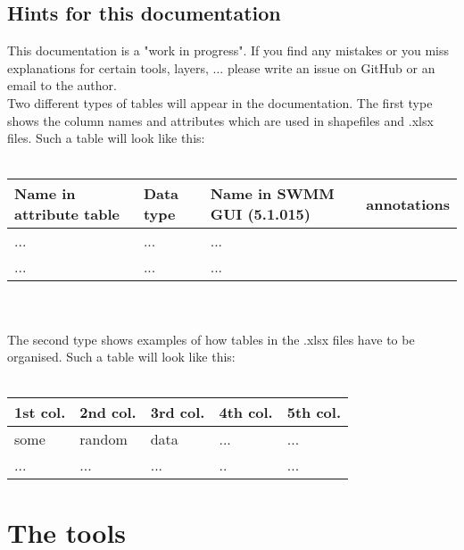\documentclass[10pt,a4paper,oneside]{scrbook}
\begin{document}
\section{Hints for this documentation}
This documentation is a "work in progress". If you find any mistakes or you miss explanations for certain tools,  layers, ... please write an issue on GitHub or an email to the author. \\
Two different types of tables will appear in the documentation. The first type shows the column names and attributes which are used in shapefiles and .xlsx files. Such a table will look like this:\\
\\
\begin{tabular}{p{1.7cm}|p{1.3cm}|P{3cm}|P{8cm}}
\hline 
\textbf{Name in attribute table} & \textbf{Data type} & \textbf{Name in SWMM GUI (5.1.015)} & \textbf{annotations}\\ 
\hline 
... & ... & ... & \\
... & ... & ... & \\
\hline
\end{tabular}
\\
\\
The second type shows examples of how tables in the .xlsx files have to be organised. Such a table will look like this:\\
\\
\begin{tabular}{|p{1.7cm}|p{1.7cm}|P{1.7cm}|P{1.7cm}|P{1.7cm}|}
\hline 
\textbf{1st col.} & \textbf{2nd col.} & \textbf{3rd col.} & \textbf{4th col.} & \textbf{5th col.}\\ 
\hline 
some & random & data & ... &...\\
\hline
... & ... & ...& .. &...\\
\hline
\end{tabular}

\chapter{The tools}
\end{document}
